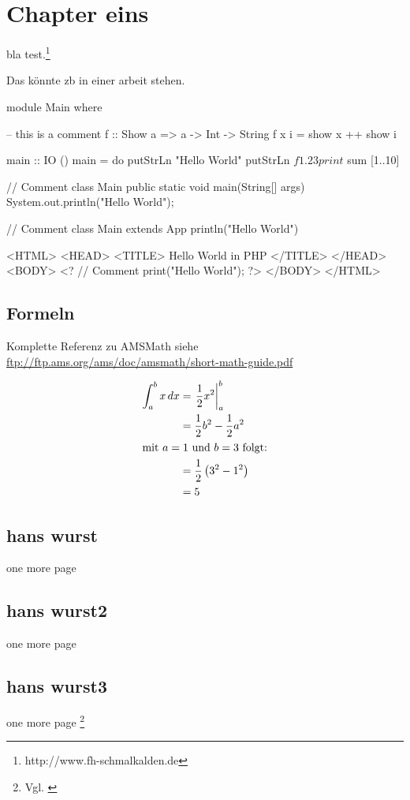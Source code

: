 \chapter{Chapter eins}
bla test.\footnote{http://www.fh-schmalkalden.de}

Das könnte \gls{zb} in einer arbeit stehen.

\begin{code}[label=listinghaskell,caption=This is Haskell]
module Main where

-- this is a comment
f :: Show a => a -> Int -> String
f x i = show x ++ show i

main :: IO ()
main = do
  putStrLn "Hello World"
  putStrLn $ f 1.2 3
  print $ sum [1..10]
\end{code}

\begin{code}[label=listingjava,caption=This is \gls{glo:Java}]
// Comment
class Main {
  public static void main(String[] args) {
    System.out.println("Hello World");
  }
}
\end{code}

\begin{code}[label=listingscala,caption=This is Scala]
// Comment
class Main extends App {
  println("Hello World")
}
\end{code}

\begin{Code}
	\centering
	
\end{Code}
\begin{code}[label=listingphp,caption={This is PHP}]
<HTML>
<HEAD>
<TITLE> Hello World in PHP </TITLE>
</HEAD>
<BODY>
<?
// Comment
 print("Hello World");
?>
</BODY>
</HTML>
\end{code}

\section{Formeln}

Komplette Referenz zu AMSMath siehe \\
\url{ftp://ftp.ams.org/ams/doc/amsmath/short-math-guide.pdf}

\begin{align}
 \int_{a}^{b} x\,dx
 & = \left.\frac{1}{2} x^2\right\vert_{a}^{b}\\
 & = \frac{1}{2} b^2 - \frac{1}{2} a^2 \\
 \intertext{mit $a=1$ und $b=3$ folgt:}
 \notag
 & = \frac{1}{2} \left(3^2 - 1^2\right)\\
 & = 5
\end{align}

\section{hans wurst}
one more page

\section{hans wurst2}
one more page

\section{hans wurst3}
one more page \footnote{Vgl. \cite{braun:scala}}

